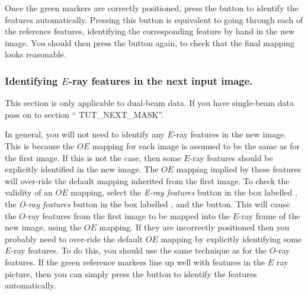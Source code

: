 \documentclass[11pt,nolof]{starlink}
\begin{document}
Once the green markers are correctly positioned, press the
 button to identify the features
automatically. Pressing this button is equivalent to going
through each of the reference features, identifying the corresponding
feature by hand in the new image. You should then press the  button again, to check that the final mapping
looks reasonable.

\subsubsection {Identifying $E$-ray features in the next input image.}
This section is only applicable to dual-beam data. If you have
single-beam data pass on to section ``
{TUT_NEXT_MASK}''.

In general, you will not need to identify any $E$-ray features in the new
image. This is because the $OE$ mapping for each image is assumed to be
the same as for the first image. If this is not the case, then some
$E$-ray features should be explicitly identified in the new image. The
$OE$ mapping implied by these features will over-ride the default mapping
inherited from the first image. To check the validity of an $OE$
mapping, select the \emph{E-ray features} button in the box labelled
, the \emph{O-ray features} button in
the box labelled , and the
 button. This will cause
the $O$-ray features from the first image to be mapped into the $E$-ray
frame of the new image, using the $OE$ mapping. If they are incorrectly
positioned then you probably need to over-ride the default $OE$ mapping
by explicitly identifying some $E$-ray features. To do this, you should
use the same technique as for the $O$-ray features. If the green
reference markers line up well with features in the $E$ ray picture, then
you can simply press the  button to
identify the features automatically.
\end{document}
